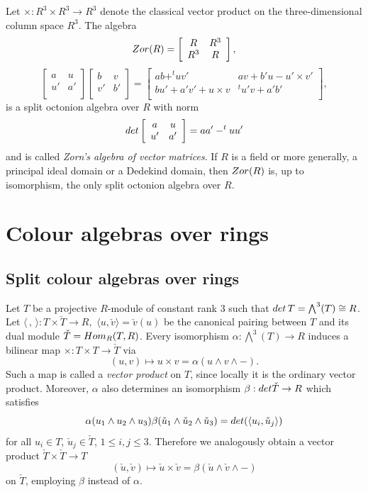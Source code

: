 \documentclass[10pt]{amsart}
\theoremstyle{plain}
\theoremstyle{definition}
\begin{document}
Let $\times:R^3\times R^3\rightarrow R^3$ denote the classical vector product on the three-dimensional column space $R^3$. The algebra
\[
{\rm Zor}(R)=
\left [\begin {array}{cc}
 R & R^3\\
R^3  &  R \\
\end {array}\right ],
\]
\[
\left [\begin {array}{cc}
 a & u\\
u'  &  a' \\
\end {array}\right ]
\left [\begin {array}{cc}
 b & v\\
v'  &  b' \\
\end {array}\right ]
=
\left [\begin {array}{cc}
 ab+ ^tuv' & av+b'u-u'\times v'\\
bu' +a'v'+u\times v & ^tu'v+ a'b' \\
\end {array}\right ],
\]
is a split octonion algebra over $R$ with norm
\[
{\rm det}
\left [\begin {array}{cc}
 a & u\\
u'  &  a' \\
\end {array}\right ]=
aa'-^tuu'
\]
and is called \emph{Zorn's algebra of vector matrices}.  If $R$ is a field or more generally, a principal ideal domain or a Dedekind domain, then ${\rm Zor}(R)$ is, up to isomorphism, the only split octonion algebra over $R$.


\section{Colour algebras over rings}\label{sec:2}

\subsection{Split colour algebras over rings}\label{sec:split}
Let $T$ be a projective $R$-module of constant rank 3 such that ${\rm det}\,T=\bigwedge^3 (T)\cong R $.
Let $\langle \,,\,\rangle:T\times\check{T}\rightarrow R,$ $ \langle u,\check{v}\rangle=\check{v}(u)$
be the canonical pairing between $T$ and its  dual module $\check{T}={\rm Hom}_R(T,R)$.
Every isomorphism $\alpha:\bigwedge^3 (T)\rightarrow R $ induces a bilinear map
$\times:T\times T\rightarrow\check{T}$ via
$$(u,v)\mapsto u\times v=\alpha(u \wedge v \wedge -).$$
Such a map is called a {\it vector product} on $T$, since locally it is the ordinary vector product. Moreover,
$\alpha$ also determines an isomorphism $\beta:{\rm det}\check{T}\rightarrow  R$
which satisfies
$$\alpha(u_1 \wedge u_2 \wedge u_3)\beta(\check{u}_1 \wedge \check{u}_2 \wedge \check{u}_3)={\rm det}(\langle u_i,\check{u}_j\rangle)$$
for all $u_i\in T$, $\check{u}_j\in\check{T}$, $1\leq i,j\leq 3$. Therefore we analogously obtain a vector product
$\check{T}\times\check{T} \longrightarrow T$
$$(\check{u},\check{v})\mapsto \check{u}\times \check{v}=\beta(\check{u} \wedge \check{v} \wedge -)$$
 on $\check{T}$, employing $\beta$ instead of $\alpha$.
\end{document}
